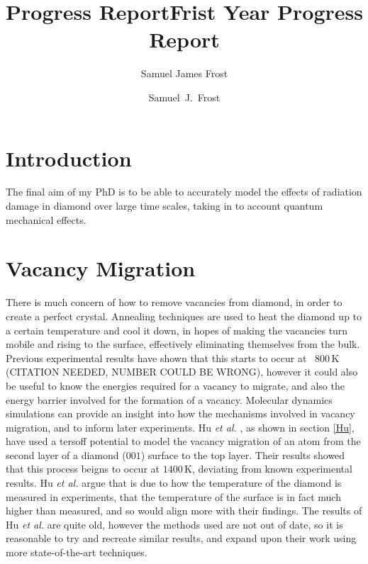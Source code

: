 \documentclass[10pt,a4paper,twocolumn,twoside]{extarticle}
\title{Progress Report}
\author{Samuel James Frost}
\title{Frist Year Progress Report}
\author{Samuel~J.~Frost}
\newcommand{\al}{\emph{et al. }}
\begin{document}
	\thispagestyle{empty}
	\tableofcontents

	
\section{Introduction}
The final aim of my PhD is to be able to accurately model the effects of radiation damage in diamond over large time scales, taking in to account quantum mechanical effects.

\section{Vacancy Migration}

There is much concern of how to remove vacancies from diamond, in order to create a perfect crystal. Annealing techniques are used to heat the diamond up to a certain temperature and cool it down, in hopes of making the vacancies turn mobile and rising to the surface, effectively eliminating themselves from the bulk. Previous experimental results have shown that this starts to occur at ~$800$\,K (CITATION NEEDED, NUMBER COULD BE WRONG), however it could also be useful to know the energies required for a vacancy to migrate, and also the energy barrier involved for the formation of a vacancy. Molecular dynamics simulations can provide an insight into how the mechanisms involved in vacancy migration, and to inform later experiments. Hu \al, as shown in section \ref{Hu}, have used a tersoff potential to model the vacancy migration of an atom from the second layer of a diamond ($001$) surface to the top layer. Their results showed that this process beigns to occur at $1400$\,K, deviating from known experimental results. Hu \al argue that is due to how the temperature of the diamond is measured in experiments, that the temperature of the surface is in fact much higher than measured, and so would align more with their findings. The results of Hu \al are quite old, however the methods used are not out of date, so it is reasonable to try and recreate similar results, and expand upon their work using more state-of-the-art techniques. 
\end{document}
